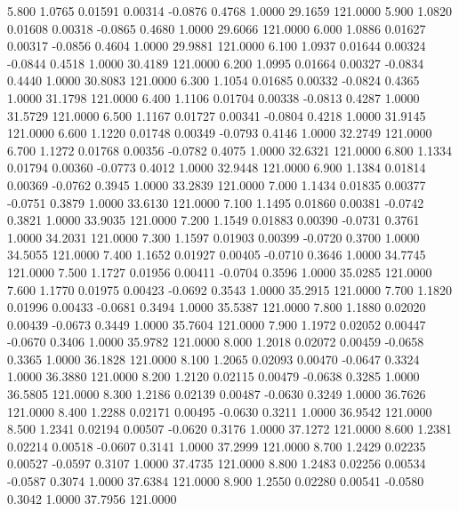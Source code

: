    5.800   1.0765   0.01591   0.00314  -0.0876   0.4768   1.0000  29.1659 121.0000
   5.900   1.0820   0.01608   0.00318  -0.0865   0.4680   1.0000  29.6066 121.0000
   6.000   1.0886   0.01627   0.00317  -0.0856   0.4604   1.0000  29.9881 121.0000
   6.100   1.0937   0.01644   0.00324  -0.0844   0.4518   1.0000  30.4189 121.0000
   6.200   1.0995   0.01664   0.00327  -0.0834   0.4440   1.0000  30.8083 121.0000
   6.300   1.1054   0.01685   0.00332  -0.0824   0.4365   1.0000  31.1798 121.0000
   6.400   1.1106   0.01704   0.00338  -0.0813   0.4287   1.0000  31.5729 121.0000
   6.500   1.1167   0.01727   0.00341  -0.0804   0.4218   1.0000  31.9145 121.0000
   6.600   1.1220   0.01748   0.00349  -0.0793   0.4146   1.0000  32.2749 121.0000
   6.700   1.1272   0.01768   0.00356  -0.0782   0.4075   1.0000  32.6321 121.0000
   6.800   1.1334   0.01794   0.00360  -0.0773   0.4012   1.0000  32.9448 121.0000
   6.900   1.1384   0.01814   0.00369  -0.0762   0.3945   1.0000  33.2839 121.0000
   7.000   1.1434   0.01835   0.00377  -0.0751   0.3879   1.0000  33.6130 121.0000
   7.100   1.1495   0.01860   0.00381  -0.0742   0.3821   1.0000  33.9035 121.0000
   7.200   1.1549   0.01883   0.00390  -0.0731   0.3761   1.0000  34.2031 121.0000
   7.300   1.1597   0.01903   0.00399  -0.0720   0.3700   1.0000  34.5055 121.0000
   7.400   1.1652   0.01927   0.00405  -0.0710   0.3646   1.0000  34.7745 121.0000
   7.500   1.1727   0.01956   0.00411  -0.0704   0.3596   1.0000  35.0285 121.0000
   7.600   1.1770   0.01975   0.00423  -0.0692   0.3543   1.0000  35.2915 121.0000
   7.700   1.1820   0.01996   0.00433  -0.0681   0.3494   1.0000  35.5387 121.0000
   7.800   1.1880   0.02020   0.00439  -0.0673   0.3449   1.0000  35.7604 121.0000
   7.900   1.1972   0.02052   0.00447  -0.0670   0.3406   1.0000  35.9782 121.0000
   8.000   1.2018   0.02072   0.00459  -0.0658   0.3365   1.0000  36.1828 121.0000
   8.100   1.2065   0.02093   0.00470  -0.0647   0.3324   1.0000  36.3880 121.0000
   8.200   1.2120   0.02115   0.00479  -0.0638   0.3285   1.0000  36.5805 121.0000
   8.300   1.2186   0.02139   0.00487  -0.0630   0.3249   1.0000  36.7626 121.0000
   8.400   1.2288   0.02171   0.00495  -0.0630   0.3211   1.0000  36.9542 121.0000
   8.500   1.2341   0.02194   0.00507  -0.0620   0.3176   1.0000  37.1272 121.0000
   8.600   1.2381   0.02214   0.00518  -0.0607   0.3141   1.0000  37.2999 121.0000
   8.700   1.2429   0.02235   0.00527  -0.0597   0.3107   1.0000  37.4735 121.0000
   8.800   1.2483   0.02256   0.00534  -0.0587   0.3074   1.0000  37.6384 121.0000
   8.900   1.2550   0.02280   0.00541  -0.0580   0.3042   1.0000  37.7956 121.0000
